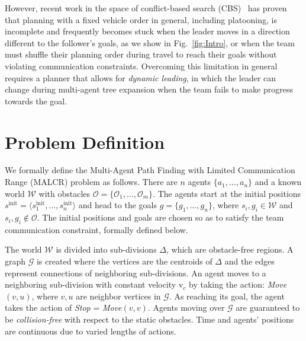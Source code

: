 \documentclass[letterpaper, 10 pt, conference]{ieeeconf}  %
\newcommand{\Symbol}[1]{\ensuremath{\mathcal{#1}}}
\newcommand{\Var}[1]{\ensuremath{{{\mathrm{#1}}}}}
\newcommand{\Subdiv}{\ensuremath{\Delta}}
\newcommand{\World}{\Symbol{W}}
\newcommand{\Obstacle}{\Symbol{O}}
\newcommand{\GoalPos}{\ensuremath{g}}
\newcommand{\Pair}[1]{\ensuremath{{\langle{#1} \rangle}}}
\begin{document}
However, recent work in the space of conflict-based search (CBS)~\cite{ma2019searching} 
has proven that planning with a fixed vehicle order in general, including platooning, 
is incomplete and frequently becomes stuck when the leader moves in a direction different 
to the follower's goals, as we show in Fig.~\ref{fig:Intro}, or when the team must shuffle 
their planning order during travel to reach their goals without violating communication constraints.
Overcoming this limitation in general requires a planner that allows for \emph{dynamic leading}, 
in which the leader can change during multi-agent tree expansion when the team fails to make progress towards the goal.



\section{Problem Definition} \label{sec:problem-formulation}

We formally define the Multi-Agent Path Finding with Limited Communication Range (MALCR) problem as follows.
There are $n$ agents $\{a_1, \ldots, a_n\}$ and a known world $\World$ with obstacles $\Obstacle = \{\Obstacle_1, \ldots, \Obstacle_m\}$. 
The agents start at the initial positions $s^\Var{init} = \Pair{s^\Var{init}_1, \ldots,s^\Var{init}_n}$ and 
head to the goals $\GoalPos = \{\GoalPos_1, \ldots,\GoalPos_n\}$, where $s_i, g_i \in \World$ and $s_i, g_i \notin \Obstacle$. 
The initial positions and goals are chosen so as to satisfy the team communication constraint, formally defined below.

The world $\World$ is divided into sub-divisions $\Subdiv$, which are obstacle-free regions. 
A graph $\mathcal{G}$ is created where the vertices are the centroids of $\Subdiv$ and the edges represent connections 
of neighboring sub-divisions. 
An agent moves to a neighboring sub-division with constant velocity $\Var{v}_c$ by taking the 
action: \textit{Move}$(v,u)$, where $v,u$ are neighbor vertices in $\mathcal{G}$. 
As reaching its goal, the agent takes the action of \textit{Stop} = \textit{Move}$(v,v)$. Agents moving over 
$\mathcal{G}$ are guaranteed to be \textit{collision-free} with respect to the static obstacles. 
Time and agents' positions are continuous due to varied lengths of actions.
\end{document}
